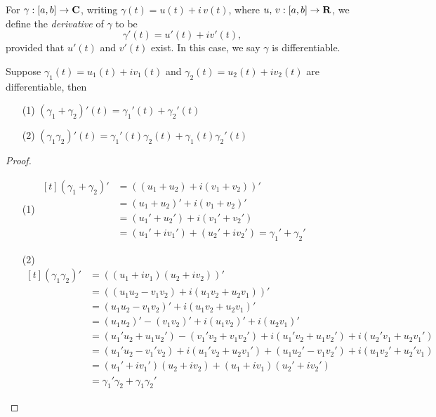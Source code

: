 \medskip

\begin{definition}
For $\gamma:[a,b] \to \mathbf C$, writing $\gamma(t) = u(t) + i\,v(t)$, where $u,\,v:[a,b] \to \mathbf R$, we define the \emph{derivative} of $\gamma$ to be
\[\gamma'(t) = u'(t) + iv'(t),\]
provided that $u'(t)$ and $v'(t)$ exist. In this case, we say $\gamma$ is differentiable.
\end{definition}

\medskip

\begin{proposition}
Suppose $\gamma_1(t) = u_1(t) + iv_1(t)$ and $\gamma_2(t) = u_2(t) + iv_2(t)$ are differentiable, then
\begin{itemize}
\item[(1)] $(\gamma_1 + \gamma_2)'(t) = \gamma_1'(t) + \gamma_2'(t)$
\item[(2)] $(\gamma_1\gamma_2)'(t) = \gamma_1'(t)\gamma_2(t) + \gamma_1(t)\gamma_2'(t)$
\end{itemize}
\end{proposition}
\begin{proof}\hfill
\begin{itemize}[itemsep=1em]
\item[(1)] 
$\begin{aligned}[t]
(\gamma_1 + \gamma_2)' &=  ((u_1 + u_2) + i(v_1 + v_2))'\\[0.5em]
&= (u_1 + u_2)' + i(v_1 + v_2)'\\[0.5em]
&= (u_1' + u_2') + i(v_1' + v_2')\\[0.5em]
&= (u_1' + iv_1') + (u_2' + iv_2') = \gamma_1' + \gamma_2'
\end{aligned}$

\item[(2)] 
$\begin{aligned}[t]
(\gamma_1\gamma_2)' &=  ((u_1 + iv_1)(u_2 + iv_2))'\\[0.5em]
&=  ((u_1u_2 - v_1v_2) + i(u_1v_2 + u_2v_1))'\\[0.5em]
&= (u_1u_2 - v_1v_2)' + i(u_1v_2 + u_2v_1)'\\[0.5em]
&= (u_1u_2)' - (v_1v_2)' + i(u_1v_2)' + i(u_2v_1)'\\[0.5em]
&= (u_1'u_2 + u_1u_2') - (v_1'v_2 + v_1v_2') + i(u_1'v_2 + u_1v_2') + i(u_2'v_1 + u_2v_1')\\[0.5em]
&= (u_1'u_2 - v_1'v_2) + i(u_1'v_2 + u_2v_1') + (u_1u_2' - v_1v_2') + i(u_1v_2' + u_2'v_1)\\[0.5em]
&= (u_1' + iv_1')(u_2 + iv_2) + (u_1 + iv_1)(u_2' + iv_2')\\[0.5em]
&= \gamma_1'\gamma_2 + \gamma_1\gamma_2'
\end{aligned}$
\end{itemize}
\vspace*{-\baselineskip}
\end{proof}

